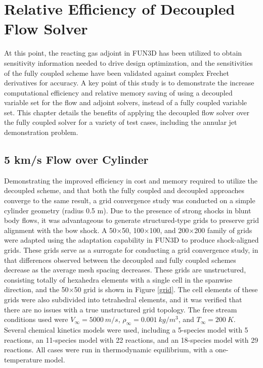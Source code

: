\chapter{Relative Efficiency of Decoupled Flow Solver}
\label{chapter-eight}

At this point, the reacting gas adjoint in FUN3D has been utilized to obtain
sensitivity information needed to drive design optimization, and the
sensitivities of the fully coupled scheme have been validated against complex
Frechet derivatives for accuracy.  A key point of this study is to demonstrate
the increase computational efficiency and relative memory saving of using a
decoupled variable set for the flow and adjoint solvers, instead of a fully
coupled variable set.  This chapter details the benefits of applying the
decoupled flow solver over the fully coupled solver for a variety of test cases,
including the annular jet demonstration problem.

\section{5 km/s Flow over Cylinder}
\label{sec:5-kps-cylinder}

Demonstrating the improved efficiency in cost and memory required to utilize the
decoupled scheme, and that both the fully coupled and decoupled approaches
converge to the same result, a grid convergence study was conducted on a simple
cylinder geometry (radius 0.5 m).  Due to the presence of strong shocks in blunt
body flows, it was advantageous to generate structured-type grids to preserve
grid alignment with the bow shock. A 50$\times$50, 100$\times$100, and
200$\times$200 family of grids were adapted using the adaptation capability in
FUN3D\cite{adaptation} to produce shock-aligned grids. These grids serve as a
surrogate for conducting a grid convergence study, in that differences observed
between the decoupled and fully coupled schemes decrease as the average mesh
spacing decreases.  These grids are unstructured, consisting totally of
hexahedra elements with a single cell in the spanwise direction, and the
50$\times$50 grid is shown in Figure \ref{grid}.  The cell elements of these
grids were also subdivided into tetrahedral elements, and it was verified that
there are no issues with a true unstructured grid topology.  The free stream
conditions used were $V_{\infty} = 5000\ m/s$, $\rho_{\infty}=0.001\ kg/m^3$,
and $T_\infty = 200\ K$.  Several chemical kinetics models were used, including
a 5-species model with 5 reactions, an 11-species model with 22 reactions, and
an 18-species model with 29 reactions.  All cases were run in thermodynamic
equilibrium, with a one-temperature model.

